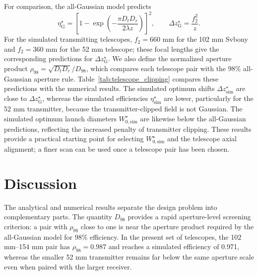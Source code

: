 \documentclass[a4paper,10pt]{article}
\begin{document}
For comparison, the all-Gaussian model predicts
\begin{equation}
    \eta_{\mathrm{G}}^\star = \left[1-\exp\left(-\frac{\pi D_tD_r}{2\lambda z}\right)\right]^2,
    \qquad \Delta z_{\mathrm{G}}^\star = \frac{f_2^2}{z}.
\end{equation}
For the simulated transmitting telescopes, $f_2=660$ mm for the 102 mm Svbony and $f_2=360$ mm for the 52 mm telescope; these focal lengths give the corresponding predictions for $\Delta z_{\mathrm{G}}^\star$. We also define the normalized aperture product $\rho_{98} = \sqrt{D_tD_r}/D_{98}$, which compares each telescope pair with the $98\%$ all-Gaussian aperture rule. Table~\ref{tab:telescope_clipping} compares these predictions with the numerical results. The simulated optimum shifts $\Delta z_{\mathrm{sim}}^\star$ are close to $\Delta z_{\mathrm{G}}^\star$, whereas the simulated efficiencies $\eta_{\mathrm{sim}}^\star$ are lower, particularly for the 52 mm transmitter, because the transmitter-clipped field is not Gaussian. The simulated optimum launch diameters $W_{0,\mathrm{sim}}^\star$ are likewise below the all-Gaussian predictions, reflecting the increased penalty of transmitter clipping. These results provide a practical starting point for selecting $W_{0,\mathrm{sim}}^\star$ and the telescope axial alignment; a finer scan can be used once a telescope pair has been chosen.

\begin{table}[htbp]
    \centering
    {
        
    }
    \caption{Comparison of optimal all-Gaussian predictions with the best sampled numerical results. Vertical lines group each Gaussian quantity with its simulated counterpart. Here, $\rho_{98}=\sqrt{D_tD_r}/D_{98}$ measures the aperture product relative to the $98\%$ rule.}
    \label{tab:telescope_clipping}
\end{table}

\section{Discussion}

The analytical and numerical results separate the design problem into complementary parts. The quantity $D_{98}$ provides a rapid aperture-level screening criterion: a pair with $\rho_{98}$ close to one is near the aperture product required by the all-Gaussian model for 98\% efficiency. In the present set of telescopes, the 102 mm--154 mm pair has $\rho_{98}=0.987$ and reaches a simulated efficiency of 0.971, whereas the smaller 52 mm transmitter remains far below the same aperture scale even when paired with the larger receiver.
\end{document}
